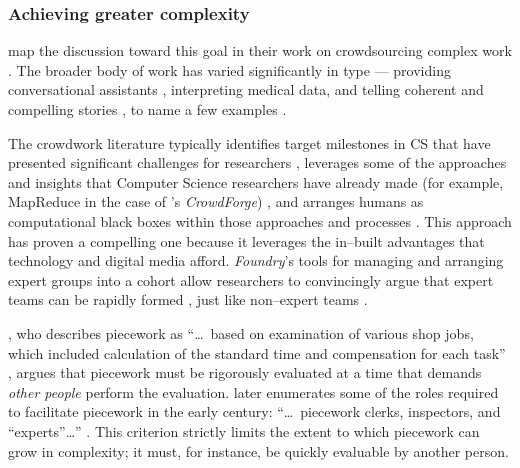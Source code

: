 \documentclass[trackingWork]{subfiles}
\begin{document}
\subsubsection[finding crowdwork's limits]{Achieving greater complexity}\label{sec:complexity}

\subsubsubsection{\crowdworkpers}
\citeauthor{crowdForgeKittur}
map the discussion toward this goal in their work on
crowdsourcing complex work
\cite{crowdForgeKittur}.
The broader body of work has varied significantly in type
--- providing conversational assistants%
, interpreting medical data, and
telling coherent and compelling stories%
, to name a few examples
\cite{Lasecki:2013:CCC:2501988.2502057,mavandadi2012distributed,KimStoria}.

The crowdwork literature typically identifies target milestones in CS
that have presented significant challenges for researchers%
, leverages some of the approaches and insights that Computer Science researchers have already made
(for example, MapReduce in the case of \citeauthor{crowdForgeKittur}'s \textit{CrowdForge})%
, and arranges humans as computational black boxes within those approaches and processes
\cite[][and others]{crowdForgeKittur,foundry}.
This approach has proven a compelling one because
it leverages the in--built advantages that technology and digital media afford.
\textit{Foundry}'s tools for managing and arranging expert groups into a cohort
allow researchers to convincingly argue that expert teams can be rapidly formed%
, just like non--expert teams
\cite{foundry}.


\subsubsubsection{\pieceworkpers}
\citeauthor{10.2307/23702539}%
, who describes piecework as
    ``\dots~based on examination of various shop jobs,
      which included calculation of the standard time and compensation for each task''%
, argues that piecework must be rigorously evaluated at a time that demands
\textit{other people} perform the evaluation.
\citeauthor{10.2307/23702539} later enumerates some of the roles required
to facilitate piecework in the early  century:
    ``\dots~piecework clerks, inspectors, and ``experts''\dots''
\cite{10.2307/23702539}.
This criterion strictly limits the extent to which piecework can grow in complexity;
it must, for instance, be quickly evaluable by another person.
\end{document}
